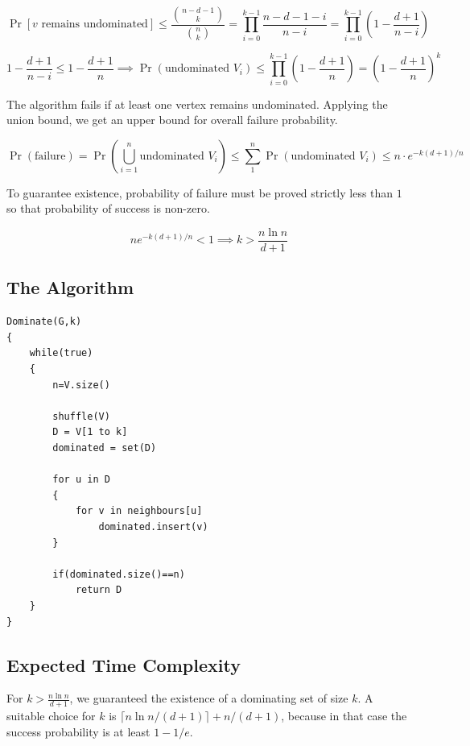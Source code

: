\[
\Pr[v\text{ remains undominated}]
\le
\frac{\binom{n-d-1}{k}}{\binom{n}{k}}
=
\prod_{i=0}^{k-1}
\frac{n-d-1-i}{n-i}
=
\prod_{i=0}^{k-1}
\left(1-\frac{d+1}{n-i}\right)
\]

\[
1-\frac{d+1}{n-i}
\le
1-\frac{d+1}{n}
\implies
\Pr\left(\text{undominated }V_i\right)
\le
\prod_{i=0}^{k-1}
\left(1-\frac{d+1}{n}\right)
=
\left(1-\frac{d+1}{n}\right)^k
\]

The algorithm fails if at least one vertex remains undominated. Applying the union bound, we get an
upper bound for overall failure probability.

\[
\Pr(\text{failure})
=
\Pr \left( \bigcup_{i=1}^n \text{undominated }V_i \right)
\le
\sum_1^n \Pr(\text{undominated }V_i)
\le
n\cdot e^{-k(d+1)/n}
\]

To guarantee existence, probability of failure must be proved strictly less than $1$ so that 
probability of success is non-zero.

\[
n e^{-k(d+1)/n}<1 
\implies
k>\frac{n\ln n}{d+1}
\]

\subsection{The Algorithm}

\begin{center}
\begin{minipage}{0.9\linewidth}
\begin{framed}
\begin{Verbatim}
Dominate(G,k)
{
    while(true)
    {
        n=V.size()

        shuffle(V)
        D = V[1 to k]
        dominated = set(D)

        for u in D
        {
            for v in neighbours[u]
                dominated.insert(v)
        }

        if(dominated.size()==n)
            return D
    }
}
\end{Verbatim}
\end{framed}
\end{minipage}
\end{center}

\subsection{Expected Time Complexity}
For $k>\frac{n\ln n}{d+1}$, we guaranteed the existence of a dominating set of size $k$. A suitable choice 
for $k$ is $\lceil n\ln n/(d+1) \rceil + n/(d+1)$, because in that case the success probability 
is at least $1-1/e$.

